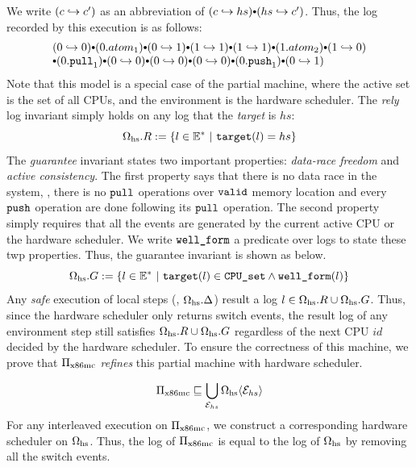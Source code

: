 \noindent
We write $(c \hookrightarrow c')$
as an abbreviation of $(c \switch hs) \cons (hs \switch c')$.
Thus,
the log recorded by this execution is as follows:
\[
\begin{array}{l}
(0\switch 0) \cons (0.atom_1)
\cons (0\switch 1) \cons (1\switch 1)
\cons  (1\switch 1) \cons (1.atom_2)
\cons (1\switch 0) \\
\cons (0.\pull_1) 
\cons (0\switch 0)
\cons (0\switch 0)
\cons (0\switch 0)
\cons (0.\push_1) 
\cons ( 0\switch 1)
\end{array}
\]
\noindent
Note that this model is a special case of the partial
machine,
where the 
active set is the set of all CPUs,
and the environment is the hardware scheduler.
The \emph{rely} log invariant simply holds
on any log that the \emph{target} is $hs$:
\[\pmach{hs}.R := \{ l \in \Ev^* \ |\ \kw{target}(l) = hs \}\]
The \emph{guarantee} invariant states
two important properties:
\emph{data-race freedom}
and \emph{active consistency}.
The first property says
 that there is no
data race in the system,
\ie, there is no ${\texttt{pull}}$ operations over ${\texttt{valid}}$
memory location and every ${\texttt{push}}$ operation
are done following its ${\texttt{pull}}$ operation.
The second property simply
requires that all the events
are generated by the current active CPU or the hardware scheduler.
We write ${\texttt{well\_form}}$ a predicate
over logs to state these twp properties.
Thus, the guarantee invariant is shown as below.
\[\Omega_{\text{hs}}.G := \{ l \in \mathbb{E}^* \ |\ {{\texttt{target}}}(l) \in {\texttt{CPU\_set}}
\land {\texttt{well\_form}}(l) \}\]
Any \emph{safe} execution of  local steps (\ie, $\Omega_{\text{hs}}.\Delta$) result a log $l \in \Omega_{\text{hs}}.R \cup \Omega_{\text{hs}}.G$.
Thus, since the hardware scheduler only returns switch events,
the result log of any environment step still satisfies
$\Omega_{\text{hs}}.R \cup \Omega_{\text{hs}}.G$ regardless
of the next CPU $id$ decided by the hardware scheduler.
To ensure the correctness of this machine,
we prove that $\Pi_{\text{x86mc}}$ \emph{refines} this
partial machine with hardware scheduler.

\begin{lemma}
\[\Pi_{\text{x86mc}} \sqsubseteq \bigcup_{\mathcal{E}_{hs}}{
\Omega_{\text{hs}}\langle \mathcal{E}_{hs} \rangle}
\]
For any interleaved execution on $\Pi_{\text{x86mc}}$, we construct
a corresponding hardware scheduler on $\Omega_{\text{hs}}$.
Thus, the log of $\Pi_{\text{x86mc}}$
is equal to the log of $\Omega_{\text{hs}}$
by removing all the switch events.
 \label{lemma:pboot}
\end{lemma}


